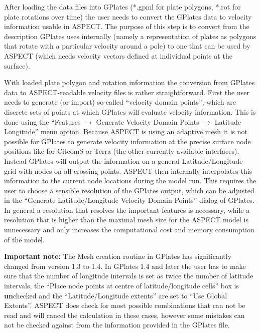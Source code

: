 \documentclass{article}
\newcommand{\aspect}{\textsc{ASPECT}}
\begin{document}
After loading the data
files into GPlates (*.gpml for plate polygons, *.rot for plate rotations over
time) the user needs to convert the GPlates data to velocity
information usable in \aspect{}. The purpose of this step is to convert from the
description GPlates uses internally (namely a representation of plates as
polygons that rotate with a particular velocity around a pole) to one that can
be used by \aspect{} (which needs velocity vectors defined at individual points
at the surface).

With loaded plate polygon and rotation information the conversion from GPlates
data to \aspect{}-readable velocity files is rather straightforward. First the
user needs to generate (or import) so-called ``velocity domain points'', which
are discrete sets of points at which GPlates will evaluate velocity
information. This is done using the ``Features $\rightarrow$ Generate Velocity
Domain Points $\rightarrow$ Latitude Longitude'' menu option. Because \aspect{}
is using an adaptive mesh it is not possible for GPlates to generate velocity
information at the precise surface node positions like for CitcomS or Terra (the
other currently available interfaces). Instead GPlates will output the
information on a general Latitude/Longitude grid with nodes on all crossing
points. \aspect{} then internally interpolates this information to the current
node locations during the model run. This requires the user to
choose a sensible resolution of the GPlates output, which can be adjusted in
the ``Generate Latitude/Longitude Velocity Domain Points'' dialog of GPlates. In
general a resolution that resolves the important features is necessary, while a
resolution that is higher than the maximal mesh size for the \aspect{}
model is unnecessary and only increases the computational cost and memory consumption of
the model. 

\textbf{Important note:} The Mesh creation routine in GPlates has significantly 
changed from version 1.3 to 1.4. In GPlates 1.4 and later the user has to make 
sure that the number of longitude intervals is set as twice the number of 
latitude intervals, the ``Place node points at centre of latitude/longitude
cells'' box is \textbf{un}checked and the ``Latitude/Longitude extents'' are set
to ``Use Global Extents''. \aspect{} does check for most possible combinations that
can not be read and will cancel the calculation in these cases, however some
mistakes can not be checked against from the information provided in the GPlates file.
\end{document}
